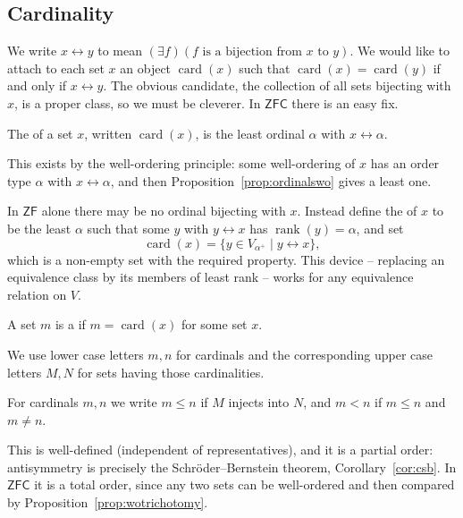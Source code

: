 \documentclass[a4paper]{scrartcl}
\newcommand{\card}{\operatorname{card}}
\newcommand{\rank}{\operatorname{rank}}
\newcommand{\ZF}{\mathsf{ZF}}
\newcommand{\ZFC}{\mathsf{ZFC}}
\begin{document}
\subsection{Cardinality}

We write $x \leftrightarrow y$ to mean $(\exists f)(f \text{ is a bijection from } x \text{ to } y)$. We would like to attach to each set $x$ an object $\card(x)$ such that $\card(x) = \card(y)$ if and only if $x \leftrightarrow y$. The obvious candidate, the collection of all sets bijecting with $x$, is a proper class, so we must be cleverer. In $\ZFC$ there is an easy fix.

\begin{definition}[Cardinality]
  The  of a set $x$, written $\card(x)$, is the least ordinal $\alpha$ with $x \leftrightarrow \alpha$.
\end{definition}

This exists by the well-ordering principle: some well-ordering of $x$ has an order type $\alpha$ with $x \leftrightarrow \alpha$, and then Proposition~\ref{prop:ordinalswo} gives a least one.

\begin{remark}
  In $\ZF$ alone there may be no ordinal bijecting with $x$. Instead define the  of $x$ to be the least $\alpha$ such that some $y$ with $y \leftrightarrow x$ has $\rank(y) = \alpha$, and set
  $$\card(x) = \{y \in V_{\alpha^+} \mid y \leftrightarrow x\},$$
  which is a non-empty set with the required property. This device -- replacing an equivalence class by its members of least rank -- works for any equivalence relation on $V$.
\end{remark}

\begin{definition}[Cardinal]
  A set $m$ is a  if $m = \card(x)$ for some set $x$.
\end{definition}

We use lower case letters $m, n$ for cardinals and the corresponding upper case letters $M, N$ for sets having those cardinalities.

\begin{definition}
  For cardinals $m, n$ we write $m \leq n$ if $M$ injects into $N$, and $m < n$ if $m \leq n$ and $m \neq n$.
\end{definition}

This is well-defined (independent of representatives), and it is a partial order: antisymmetry is precisely the Schr\"oder--Bernstein theorem, Corollary~\ref{cor:csb}. In $\ZFC$ it is a total order, since any two sets can be well-ordered and then compared by Proposition~\ref{prop:wotrichotomy}.
\end{document}
